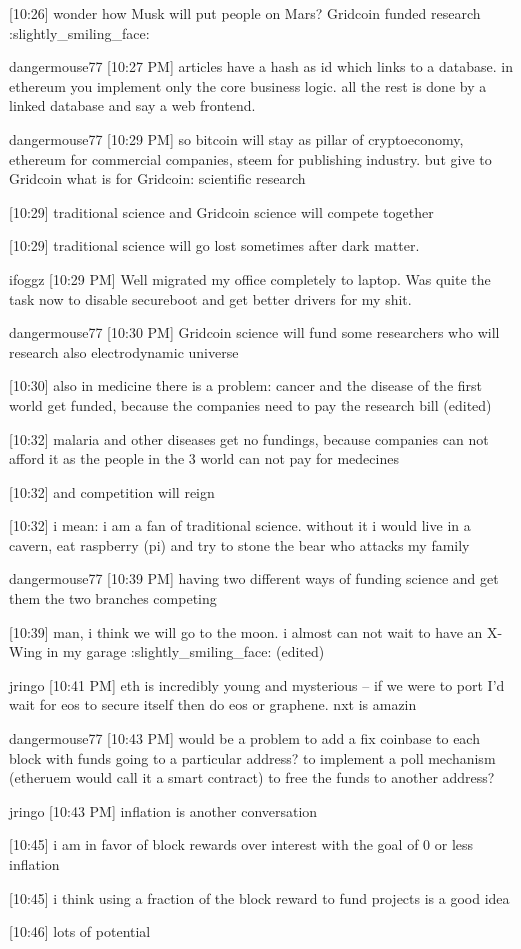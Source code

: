 {[10:26] 
wonder how Musk will put people on Mars? Gridcoin funded research :slightly_smiling_face:


dangermouse77 [10:27 PM] 
articles have a hash as id which links to a database. in ethereum you implement only the core business logic. all the rest is done by a linked database and say a web frontend.


dangermouse77 [10:29 PM] 
so bitcoin will stay as pillar of cryptoeconomy, ethereum for commercial companies, steem for publishing industry. but give to Gridcoin what is for Gridcoin: scientific research


[10:29] 
traditional science and Gridcoin science will compete together


[10:29] 
traditional science will go lost sometimes after dark matter.


ifoggz
[10:29 PM] 
Well migrated my office completely to laptop. Was quite the task now to disable secureboot and get better drivers for my shit.


dangermouse77 [10:30 PM] 
Gridcoin science will fund some researchers who will research also electrodynamic universe


[10:30] 
also in medicine there is a problem: cancer and the disease of the first world get funded, because the companies need to pay the research bill (edited)


[10:32] 
malaria and other diseases get no fundings, because companies can not afford it as the people in the 3 world can not pay for medecines


[10:32] 
and competition will reign


[10:32] 
i mean: i am a fan of traditional science. without it i would live in a cavern, eat raspberry (pi) and try to stone the bear who attacks my family


dangermouse77 [10:39 PM] 
having two different ways of funding science and get them the two branches competing


[10:39] 
man, i think we will go to the moon. i almost can not wait to have an X-Wing in my garage :slightly_smiling_face: (edited)


jringo [10:41 PM] 
eth is incredibly young and mysterious -- if we were to port I'd wait for eos to secure itself then do eos or graphene.  nxt is amazin


dangermouse77 [10:43 PM] 
would be a problem to add a fix coinbase to each block with funds going to a particular address? to implement a poll mechanism (etheruem would call it a smart contract) to free the funds to another address?


jringo [10:43 PM] 
inflation is another conversation


[10:45] 
i am in favor of block rewards over interest with the goal of 0 or less inflation


[10:45] 
i think using a fraction of the block reward to fund projects is a good idea


[10:46] 
lots of potential
}